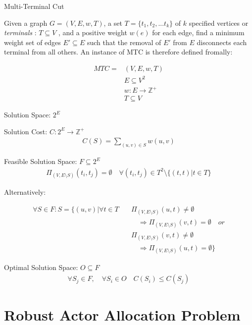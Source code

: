 \documentclass{article}
\begin{document}
\begin{definition}
Multi-Terminal Cut

Given a graph $G=(V,E,w,T)$, a set $T=\{t_1, t_2, ... t_k\}$ of $k$ specified vertices or {\em terminals} : $T \subseteq V$ , and a positive weight $w(e)$ for each edge, find a minimum weight set of edges $E' \subseteq E$ such that the removal of $E'$ from $E$ disconnects each terminal from all others.
An instance of MTC is therefore defined fromally:

\begin{align}
	\nonumber MTC = & (V,E,w,T)\\
	\nonumber & E \subseteq V^2\\
	\nonumber & w : E \rightarrow \mathbb{Z}^+\\
	\nonumber & T \subseteq V
\end{align}

Solution Space: $2^E$

Solution Cost: $C : 2^E \rightarrow \mathbb{Z}^+$
\begin{align}
	\nonumber C(S) = \displaystyle\sum\limits_{(u,v) \in S} w(u,v)
\end{align}

Feasible Solution Space: $F \subseteq 2^E$
\begin{align}
	\nonumber \Pi_{(V,E \setminus S)}(t_i, t_j) = \emptyset \quad \forall (t_i, t_j) \in T^2 \setminus \{(t, t) | t \in T\}
\end{align}

Alternatively:

\begin{align}
	\nonumber \forall S \in F : S = \{(u, v) | \forall t \in T \quad & \Pi_{(V,E \setminus S)}(u, t) \neq \emptyset \\
	\nonumber & \quad \Rightarrow \Pi_{(V,E \setminus S)}(v, t) = \emptyset \quad or \\
	\nonumber & \Pi_{(V,E \setminus S)}(v, t) \neq \emptyset \\
	\nonumber & \quad \Rightarrow \Pi_{(V,E \setminus S)}(u, t) = \emptyset \}
\end{align}

Optimal Solution Space: $O \subseteq F$
\begin{align}
	\forall S_j \in F , \quad \forall S_i \in O \quad \nonumber C(S_i) \leq C(S_j)
\end{align}

\end{definition}


\section{Robust Actor Allocation Problem}
\end{document}

